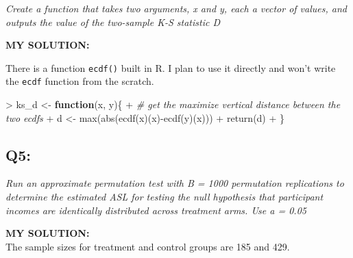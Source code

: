 \documentclass[
]{article}
\newenvironment{Shaded}{\begin{snugshade}}{\end{snugshade}}
\newcommand{\CommentTok}[1]{\textcolor[rgb]{0.56,0.35,0.01}{\textit{#1}}}
\newcommand{\ControlFlowTok}[1]{\textcolor[rgb]{0.13,0.29,0.53}{\textbf{#1}}}
\newcommand{\FunctionTok}[1]{\textcolor[rgb]{0.00,0.00,0.00}{#1}}
\newcommand{\NormalTok}[1]{#1}
\newcommand{\OtherTok}[1]{\textcolor[rgb]{0.56,0.35,0.01}{#1}}
\newcommand{\SpecialCharTok}[1]{\textcolor[rgb]{0.00,0.00,0.00}{#1}}
\begin{document}
\emph{Create a function that takes two arguments, x and y, each a vector
of values, and outputs the value of the two-sample K-S statistic D}

\textbf{MY SOLUTION:}

There is a function \texttt{ecdf()} built in R. I plan to use it
directly and won't write the \texttt{ecdf} function from the scratch.

\begin{Shaded}
\begin{Highlighting}[]
\SpecialCharTok{\textgreater{}}\NormalTok{ ks\_d }\OtherTok{\textless{}{-}} \ControlFlowTok{function}\NormalTok{(x, y)\{}
\SpecialCharTok{+}   \CommentTok{\# get the maximize vertical distance between the two ecdfs}
\SpecialCharTok{+}\NormalTok{   d }\OtherTok{\textless{}{-}} \FunctionTok{max}\NormalTok{(}\FunctionTok{abs}\NormalTok{(}\FunctionTok{ecdf}\NormalTok{(x)(x)}\SpecialCharTok{{-}}\FunctionTok{ecdf}\NormalTok{(y)(x)))}
\SpecialCharTok{+}   \FunctionTok{return}\NormalTok{(d)}
\SpecialCharTok{+}\NormalTok{ \}}
\end{Highlighting}
\end{Shaded}

\hypertarget{q5}{%
\subsection{Q5:}\label{q5}}

\emph{Run an approximate permutation test with B = 1000 permutation
replications to determine the estimated ASL for testing the null
hypothesis that participant incomes are identically distributed across
treatment arms. Use a = 0.05}

\textbf{MY SOLUTION:}\\
The sample sizes for treatment and control groups are 185 and 429.
\end{document}
